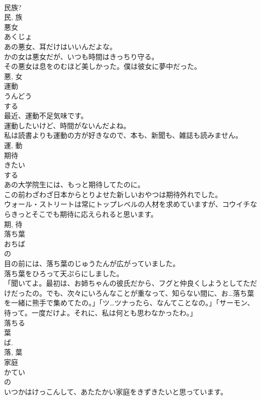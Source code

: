 \documentclass[8pt]{extreport}
\begin{document}
\begin{CJK}{UTF8}{min}
\\	民族?	
\\	民, 族	
\\	悪女	
\\	あくじょ	
\\	あの悪女、耳だけはいいんだよな。	
\\	かの女は悪女だが、いつも時間はきっちり守る。	
\\	その悪女は息をのむほど美しかった。僕は彼女に夢中だった。	
\\	悪, 女	
\\	運動	
\\	うんどう	
\\	する 
\\	最近、運動不足気味です。	
\\	運動したいけど、時間がないんだよね。	
\\	私は読書よりも運動の方が好きなので、本も、新聞も、雑誌も読みません。	
\\	運, 動	
\\	期待	
\\	きたい	
\\	する 
\\	あの大学院生には、もっと期待してたのに。	
\\	この前わざわざ日本からとりよせた新しいおやつは期待外れでした。	
\\	ウォール・ストリートは常にトップレベルの人材を求めていますが、コウイチならきっとそこでも期待に応えられると思います。	
\\	期, 待	
\\	落ち葉	
\\	おちば	
\\	の 
\\	目の前には、落ち葉のじゅうたんが広がっていました。	
\\	落ち葉をひろって天ぷらにしました。	
\\	「聞いてよ。最初は、お姉ちゃんの彼氏だから、フグと仲良くしようとしてただけだったの。でも、次々にいろんなことが重なって、知らない間に、お…落ち葉を一緒に熊手で集めてたの。」「ツ…ツナったら、なんてことなの。」「サーモン、待って。一度だけよ。それに、私は何とも思わなかったわ。」	
\\	落ちる 
\\	葉 
\\	ば. 
\\	落, 葉	
\\	家庭	
\\	かてい	
\\	の 
\\	いつかはけっこんして、あたたかい家庭をきずきたいと思っています。	

\end{CJK}
\end{document}
